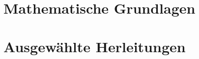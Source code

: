 \documentclass{book}
\begin{document}
  \newpage
  \chapter{Mathematische Grundlagen}\label{cha:mathematische-grundlagen}
  \minitoc%
  \clearpage
    
  
  \newpage
  \chapter{Ausgewählte Herleitungen}\label{cha:ausgewaehlte-herleitungen}
  \minitoc%
  \clearpage
\end{document}
